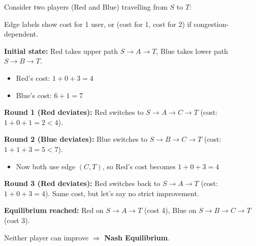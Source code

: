 \begin{exbox}
Consider two players (Red and Blue) travelling from $S$ to $T$:

\begin{center}
\end{center}

Edge labels show cost for 1 user, or (cost for 1, cost for 2) if congestion-dependent.

\textbf{Initial state:} Red takes upper path $S \to A \to T$, Blue takes lower path $S \to B \to T$.
\begin{itemize}
  \item Red's cost: $1 + 0 + 3 = 4$
  \item Blue's cost: $6 + 1 = 7$
\end{itemize}

\textbf{Round 1 (Red deviates):} Red switches to $S \to A \to C \to T$ (cost: $1 + 0 + 1 = 2 < 4$).

\textbf{Round 2 (Blue deviates):} Blue switches to $S \to B \to C \to T$ (cost: $1 + 1 + 3 = 5 < 7$).
\begin{itemize}
  \item Now both use edge $(C, T)$, so Red's cost becomes $1 + 0 + 3 = 4$
\end{itemize}

\textbf{Round 3 (Red deviates):} Red switches back to $S \to A \to T$ (cost: $1 + 0 + 3 = 4$). Same cost, but let's say no strict improvement.

\textbf{Equilibrium reached:} Red on $S \to A \to T$ (cost 4), Blue on $S \to B \to C \to T$ (cost 3).

Neither player can improve $\Rightarrow$ \textbf{Nash Equilibrium}.
\end{exbox}

